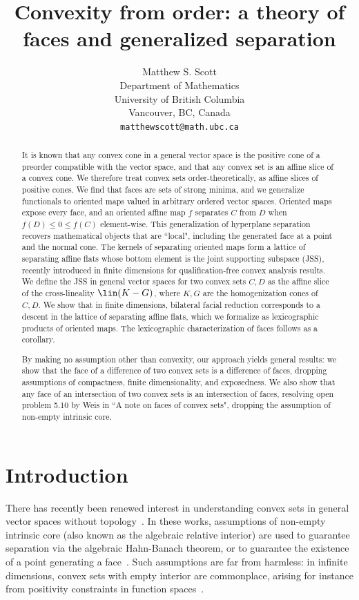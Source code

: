 \documentclass{article}
\title{Convexity from order: a theory of faces and generalized separation}
\author{
  Matthew S. Scott \\
  Department of Mathematics \\
  University of British Columbia \\
  Vancouver, BC, Canada \\
  \texttt{matthewscott@math.ubc.ca}
}
\theoremstyle{plain}
\theoremstyle{definition}
\theoremstyle{remark}
\begin{document}
\maketitle
\begin{abstract}
It is known that any convex cone in a general vector space is the positive cone of a preorder compatible with the vector space,
and that any convex set is an affine slice of a convex cone.
We therefore treat convex sets order-theoretically, as affine slices of positive cones.
We find that faces are sets of strong minima,
and we generalize functionals to oriented maps valued in arbitrary ordered vector
spaces. Oriented maps expose every face, and an oriented affine map $f$
separates $C$ from $D$ when $f(D) \le 0 \le f(C)$ element-wise.
This generalization of hyperplane separation recovers mathematical objects that
are ``local", including the generated face at a point and the normal cone. The kernels of separating oriented
maps form a lattice of separating affine flats whose bottom element is the joint
supporting subspace (JSS), recently introduced in finite dimensions for
qualification-free convex analysis results.
We define the JSS in general vector spaces
for two convex sets $C, D$ as the affine slice of the cross-lineality $\lin(K-G)$,
where $K,G$ are the homogenization cones of $C, D$.
We show that in finite dimensions, bilateral facial reduction corresponds to a descent 
in the lattice of separating affine flats, which we formalize as lexicographic
products of oriented maps. The lexicographic characterization of faces follows as a corollary.

By making no assumption other than convexity, our approach yields general results: we
show that the face of a difference of two convex sets is a difference of faces, dropping
assumptions of compactness, finite dimensionality, and exposedness.
We also show that any face of an intersection of two convex sets is an intersection
of faces, resolving open problem 5.10 by Weis in ``A note on faces of convex sets",
dropping the assumption of non-empty intrinsic core.
\end{abstract}
\section{Introduction}
\label{loc:body.introduction}
There has recently been renewed interest in understanding convex sets in general vector spaces without topology~\cite{novoRelativelySolidConvex2021, millanIntrinsicCoreMinimal2023, weisNoteFacesConvex2025}.
In these works, assumptions of non-empty intrinsic core (also known as the algebraic relative
interior) are used to guarantee separation via
the algebraic Hahn-Banach theorem, or to guarantee the existence of a point generating 
a face~\cite{weisFaceGeneratedPoint2021}.
Such assumptions are far from harmless: in infinite dimensions, convex
sets with empty interior are commonplace, arising for instance from
positivity constraints in function spaces~\cite[Example 2]{weisNoteFacesConvex2025}.
\end{document}
